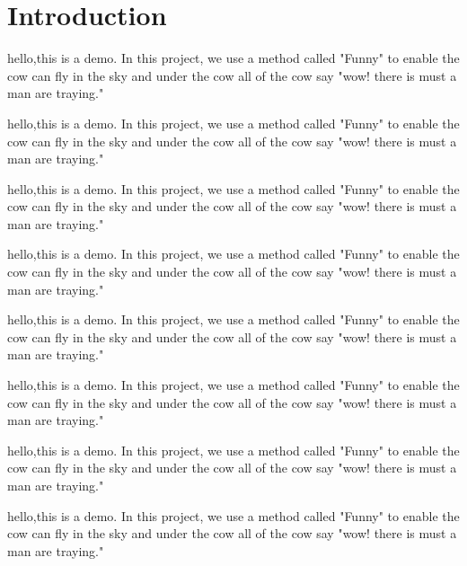 \section{Introduction}
\label{sec:intro}


hello,this is a demo. In this project, we use a method called "Funny" to enable the cow can fly in the sky and under the cow all of the cow say "wow! there is must a man are traying."

hello,this is a demo. In this project, we use a method called "Funny" to enable the cow can fly in the sky and under the cow all of the cow say "wow! there is must a man are traying."

hello,this is a demo. In this project, we use a method called "Funny" to enable the cow can fly in the sky and under the cow all of the cow say "wow! there is must a man are traying."

hello,this is a demo. In this project, we use a method called "Funny" to enable the cow can fly in the sky and under the cow all of the cow say "wow! there is must a man are traying."

hello,this is a demo. In this project, we use a method called "Funny" to enable the cow can fly in the sky and under the cow all of the cow say "wow! there is must a man are traying."

hello,this is a demo. In this project, we use a method called "Funny" to enable the cow can fly in the sky and under the cow all of the cow say "wow! there is must a man are traying."

hello,this is a demo. In this project, we use a method called "Funny" to enable the cow can fly in the sky and under the cow all of the cow say "wow! there is must a man are traying."

hello,this is a demo. In this project, we use a method called "Funny" to enable the cow can fly in the sky and under the cow all of the cow say "wow! there is must a man are traying."

